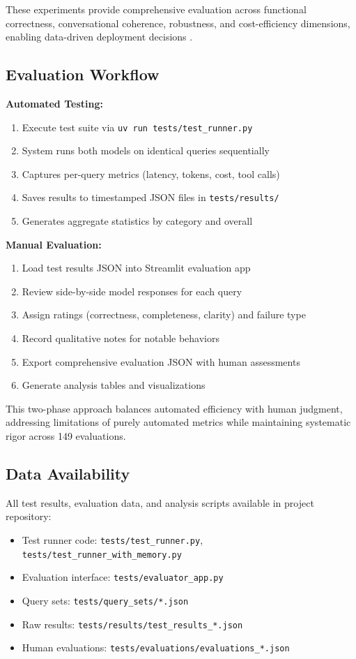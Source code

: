 \documentclass{article}
\begin{document}
These experiments provide comprehensive evaluation across functional correctness, conversational coherence, robustness, and cost-efficiency dimensions, enabling data-driven deployment decisions \cite{anthropic2025multiagent, llmmas2025software}.

\subsection{Evaluation Workflow}

\textbf{Automated Testing:}
\begin{enumerate}
    \item Execute test suite via \texttt{uv run tests/test\_runner.py}
    \item System runs both models on identical queries sequentially
    \item Captures per-query metrics (latency, tokens, cost, tool calls)
    \item Saves results to timestamped JSON files in \texttt{tests/results/}
    \item Generates aggregate statistics by category and overall
\end{enumerate}

\textbf{Manual Evaluation:}
\begin{enumerate}
    \item Load test results JSON into Streamlit evaluation app
    \item Review side-by-side model responses for each query
    \item Assign ratings (correctness, completeness, clarity) and failure type
    \item Record qualitative notes for notable behaviors
    \item Export comprehensive evaluation JSON with human assessments
    \item Generate analysis tables and visualizations
\end{enumerate}

This two-phase approach balances automated efficiency with human judgment, addressing limitations of purely automated metrics \cite{teachable2025agents} while maintaining systematic rigor across 149 evaluations.

\subsection{Data Availability}

All test results, evaluation data, and analysis scripts available in project repository:
\begin{itemize}
    \item Test runner code: \texttt{tests/test\_runner.py}, \texttt{tests/test\_runner\_with\_memory.py}
    \item Evaluation interface: \texttt{tests/evaluator\_app.py}
    \item Query sets: \texttt{tests/query\_sets/*.json}
    \item Raw results: \texttt{tests/results/test\_results\_*.json}
    \item Human evaluations: \texttt{tests/evaluations/evaluations\_*.json}
\end{itemize}
\end{document}
